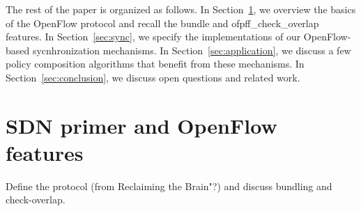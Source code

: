 \documentclass[conference]{sigcomm-alternate}
\begin{document}

%
The rest of the paper is organized as follows.
In Section~\ref{sec:model}, we overview the basics of the  OpenFlow
protocol and recall the bundle and \textsf{ofpff\_check\_overlap} features. 
In Section~\ref{sec:sync}, we specify the implementations of our OpenFlow-based
sycnhronization mechanisms. 
In Section~\ref{sec:application}, we discuss a few policy composition
algorithms that benefit from these mechanisms. 
In Section~\ref{sec:conclusion}, we discuss open questions and related work.


\section{SDN primer and OpenFlow features}\label{sec:model}

Define the protocol (from Reclaiming the Brain"?) and discuss bundling
and check-overlap. 
\end{document}
